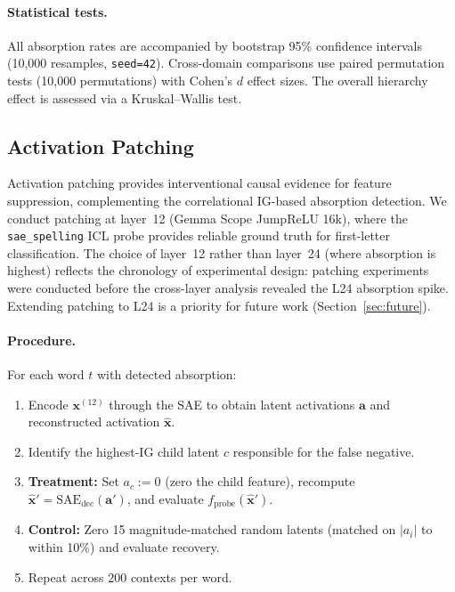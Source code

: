 \documentclass{article}
\begin{document}
\paragraph{Statistical tests.} All absorption rates are accompanied by bootstrap 95\% confidence intervals (10,000 resamples, \texttt{seed=42}). Cross-domain comparisons use paired permutation tests (10,000 permutations) with Cohen's $d$ effect sizes. The overall hierarchy effect is assessed via a Kruskal--Wallis test.

\subsection{Activation Patching}
\label{sec:patching}

Activation patching provides interventional causal evidence for feature suppression, complementing the correlational IG-based absorption detection. We conduct patching at layer~12 (Gemma Scope JumpReLU 16k), where the \texttt{sae\_spelling} ICL probe provides reliable ground truth for first-letter classification. The choice of layer~12 rather than layer~24 (where absorption is highest) reflects the chronology of experimental design: patching experiments were conducted before the cross-layer analysis revealed the L24 absorption spike. Extending patching to L24 is a priority for future work (Section~\ref{sec:future}).

\paragraph{Procedure.} For each word $t$ with detected absorption:

\begin{enumerate}
\item Encode $\mathbf{x}^{(12)}$ through the SAE to obtain latent activations $\mathbf{a}$ and reconstructed activation $\hat{\mathbf{x}}$.
\item Identify the highest-IG child latent $c$ responsible for the false negative.
\item \textbf{Treatment:} Set $a_c := 0$ (zero the child feature), recompute $\hat{\mathbf{x}}' = \text{SAE}_{\text{dec}}(\mathbf{a}')$, and evaluate $f_{\text{probe}}(\hat{\mathbf{x}}')$.
\item \textbf{Control:} Zero 15 magnitude-matched random latents (matched on $|a_i|$ to within 10\%) and evaluate recovery.
\item Repeat across 200 contexts per word.
\end{enumerate}
\end{document}
